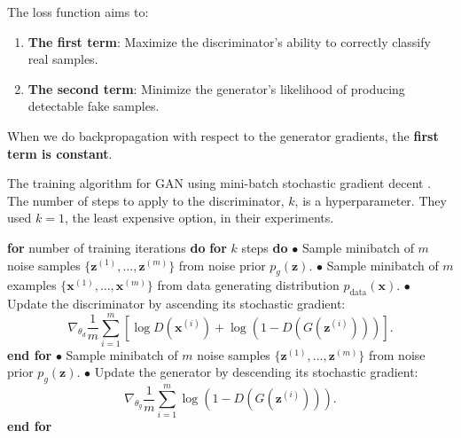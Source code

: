 The loss function aims to:

\begin{enumerate}
    \item \textbf{The first term}: Maximize the discriminator's ability to correctly classify real samples.
    \item \textbf{The second term}: Minimize the generator's likelihood of producing detectable fake samples.
\end{enumerate}

When we do backpropagation with respect to the generator gradients, the \textbf{first term is constant}.








\begin{algorithm}
    \caption{The training algorithm for GAN using mini-batch stochastic gradient decent \cite{gan}. The number of steps to apply to the discriminator, $k$, is a hyperparameter. They used $k = 1$, the least expensive option, in their experiments.} 
    \label{alg:gan_training}
    \begin{algorithmic}
        \State \textbf{for} number of training iterations \textbf{do}
        \State \quad \textbf{for} $k$ steps \textbf{do}
        \Statex \qquad $\bullet$ Sample minibatch of $m$ noise samples $\{ \mathbf{z}^{(1)}, \dots, \mathbf{z}^{(m)} \}$ from noise prior $p_g(\mathbf{z})$.
        \Statex \qquad $\bullet$ Sample minibatch of $m$ examples $\{ \mathbf{x}^{(1)}, \dots, \mathbf{x}^{(m)} \}$ from data generating distribution $p_{\text{data}}(\mathbf{x})$.
        \Statex \qquad $\bullet$ Update the discriminator by ascending its stochastic gradient:
        \Statex
        \[
        \nabla_{\theta_d} \frac{1}{m} \sum_{i=1}^{m} \left[ \log D \left( \mathbf{x}^{(i)} \right) + \log \left( 1 - D \left( G \left( \mathbf{z}^{(i)} \right) \right) \right) \right] .
        \]
        \State \quad \textbf{end for}
        \Statex \quad $\bullet$ Sample minibatch of $m$ noise samples $\{ \mathbf{z}^{(1)}, \dots, \mathbf{z}^{(m)} \}$ from noise prior $p_g(\mathbf{z})$.
        \Statex \quad $\bullet$ Update the generator by descending its stochastic gradient:
        \Statex
        \[
        \nabla_{\theta_g} \frac{1}{m} \sum_{i=1}^{m} \log \left( 1 - D \left( G \left( \mathbf{z}^{(i)} \right) \right) \right) .
        \]
        \State \textbf{end for}
    \end{algorithmic}
\end{algorithm}







